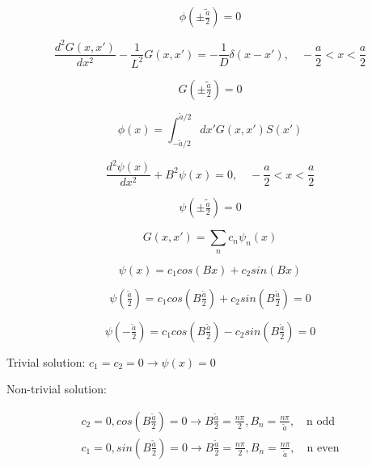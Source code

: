 \documentclass[12pt]{article}
\begin{document}
\begin{equation*}
\phi\left(\pm\tilde{\tfrac{a}{2}}\right) = 0
\end{equation*}

\begin{equation*}
\frac{d^2G(x,x')}{dx^2} - \frac{1}{L^2}G(x,x') = -\frac{1}{D}\delta(x-x'),\quad
-\frac{a}{2} < x < \frac{a}{2}
\end{equation*}

\begin{equation*}
G\left(\pm\tilde{\tfrac{a}{2}}\right) = 0
\end{equation*}

\begin{equation*}
\phi(x) = \int_{-\tilde{a}/2}^{\tilde{a}/2}dx'G(x,x')S(x')
\end{equation*}

\begin{equation*}
\frac{d^2\psi(x)}{dx^2} + B^2\psi(x) = 0,\quad
-\frac{a}{2} < x < \frac{a}{2}
\end{equation*}

\begin{equation*}
\psi\left(\pm\tilde{\tfrac{a}{2}}\right) = 0
\end{equation*}

\begin{equation*}
G(x,x') = \sum_n c_n \psi_n(x)
\end{equation*}

\begin{equation*}
\psi(x) = c_1cos(Bx) + c_2sin(Bx)
\end{equation*}

\begin{equation*}
\psi(\tfrac{\tilde{a}}{2}) = c_1cos(B\tfrac{\tilde{a}}{2}) + c_2sin(B\tfrac{\tilde{a}}{2}) = 0
\end{equation*}

\begin{equation*}
\psi(-\tfrac{\tilde{a}}{2}) = c_1cos(B\tfrac{\tilde{a}}{2}) - c_2sin(B\tfrac{\tilde{a}}{2}) = 0
\end{equation*}

Trivial solution: $c_1 = c_2 = 0 \rightarrow \psi(x) = 0$


Non-trivial solution:

\begin{gather*}
c_2 = 0, cos(B\tfrac{\tilde{a}}{2}) = 0 \rightarrow B\frac{\tilde{a}}{2} = \frac{n\pi}{2}, B_n = \frac{n\pi}{\tilde{a}},\quad\text{n odd} \\
c_1 = 0, sin(B\tfrac{\tilde{a}}{2}) = 0 \rightarrow B\frac{\tilde{a}}{2} = \frac{n\pi}{2}, B_n = \frac{n\pi}{\tilde{a}},\quad\text{n even}
\end{gather*}
\end{document}
